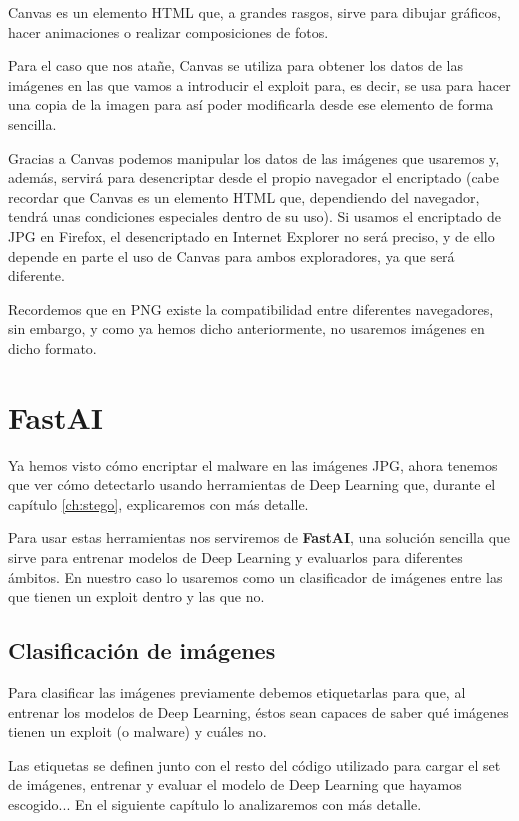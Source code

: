 Canvas es un elemento HTML que, a grandes rasgos, sirve para dibujar gráficos, hacer animaciones o realizar composiciones de fotos. %

Para el caso que nos atañe, Canvas se utiliza para obtener los datos de las imágenes en las que vamos a introducir el exploit para, es decir, se usa para hacer una copia de la imagen para así poder modificarla desde ese elemento de forma sencilla.

Gracias a Canvas podemos manipular los datos de las imágenes que usaremos y, además, servirá para desencriptar desde el propio navegador el encriptado (cabe recordar que Canvas es un elemento HTML que, dependiendo del navegador, tendrá unas condiciones especiales dentro de su uso). Si usamos el encriptado de JPG en Firefox, el desencriptado en Internet Explorer no será preciso, y de ello depende en parte el uso de Canvas para ambos exploradores, ya que será diferente.

Recordemos que en PNG existe la compatibilidad entre diferentes navegadores, sin embargo, y como ya hemos dicho anteriormente, no usaremos imágenes en dicho formato.

\section{FastAI}

Ya hemos visto cómo encriptar el malware en las imágenes JPG, ahora tenemos que ver cómo detectarlo usando herramientas de Deep Learning que, durante el capítulo \ref{ch:stego}, explicaremos con más detalle.

Para usar estas herramientas nos serviremos de \textbf{FastAI}, una solución sencilla que sirve para entrenar modelos de Deep Learning y evaluarlos para diferentes ámbitos. En nuestro caso lo usaremos como un clasificador de imágenes entre las que tienen un exploit dentro y las que no. %

\subsection{Clasificación de imágenes}

Para clasificar las imágenes previamente debemos etiquetarlas para que, al entrenar los modelos de Deep Learning, éstos sean capaces de saber qué imágenes tienen un exploit (o malware) y cuáles no.

Las etiquetas se definen junto con el resto del código utilizado para cargar el set de imágenes, entrenar y evaluar el modelo de Deep Learning que hayamos escogido... En el siguiente capítulo lo analizaremos con más detalle.

